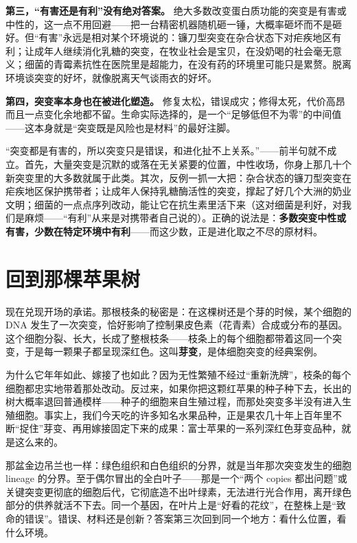\textbf{第三，“有害还是有利”没有绝对答案。} 绝大多数改变蛋白质功能的突变是有害或中性的，这一点不用回避——把一台精密机器随机砸一锤，大概率砸坏而不是砸好。但“有害”永远是相对某个环境说的：镰刀型突变在杂合状态下对疟疾地区有利；让成年人继续消化乳糖的突变，在牧业社会是宝贝，在没奶喝的社会毫无意义；细菌的青霉素抗性在医院里是超能力，在没有药的环境里可能只是累赘。脱离环境谈突变的好坏，就像脱离天气谈雨衣的好坏。

\textbf{第四，突变率本身也在被进化塑造。} 修复太松，错误成灾；修得太死，代价高昂而且一点变化余地都不留。生命实际选择的，是一个“足够低但不为零”的中间值——这本身就是“突变既是风险也是材料”的最好注脚。

\begin{wuqu}
“突变都是有害的，所以突变只是错误，和进化扯不上关系。”——前半句就不成立。首先，大量突变是沉默的或落在无关紧要的位置，中性收场，你身上那几十个新突变里的大多数就属于此类。其次，反例一抓一大把：杂合状态的镰刀型突变在疟疾地区保护携带者；让成年人保持乳糖酶活性的突变，撑起了好几个大洲的奶业文明；细菌的一点点序列改动，能让它在抗生素里活下来（这对细菌是利好，对我们是麻烦——“有利”从来是对携带者自己说的）。正确的说法是：\textbf{多数突变中性或有害，少数在特定环境中有利}——而这少数，正是进化取之不尽的原材料。
\end{wuqu}

\section{回到那棵苹果树}

现在兑现开场的承诺。那根枝条的秘密是：在这棵树还是个芽的时候，某个细胞的 DNA 发生了一次突变，恰好影响了控制果皮色素（花青素）合成或分布的基因。这个细胞分裂、长大，长成了整根枝条——枝条上的每个细胞都带着这同一个突变，于是每一颗果子都呈现深红色。这叫\textbf{芽变}，是体细胞突变的经典案例。

为什么它年年如此、嫁接了也如此？因为无性繁殖不经过“重新洗牌”，枝条的每个细胞都忠实地带着那处改动。反过来，如果你把这颗红苹果的种子种下去，长出的树大概率退回普通模样——种子的细胞来自生殖过程，而那处突变多半没有进入生殖细胞。事实上，我们今天吃的许多知名水果品种，正是果农几十年上百年里不断“捉住”芽变、再用嫁接固定下来的成果：富士苹果的一系列深红色芽变品种，就是这么来的。

那盆金边吊兰也一样：绿色组织和白色组织的分界，就是当年那次突变发生的细胞 lineage 的分界。至于偶尔冒出的全白叶子——那是一个“两个 copies 都出问题”或关键突变更彻底的细胞后代，它彻底造不出叶绿素，无法进行光合作用，离开绿色部分的供养就活不下去。同一个基因，在叶片上是“好看的花纹”，在整株上是“致命的错误”。错误、材料还是创新？答案第三次回到同一个地方：看什么位置，看什么环境。

